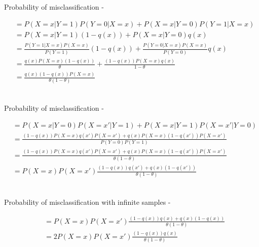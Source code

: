 \documentclass[letterpaper]{article}
\begin{document}
\subsection{}

Probability of misclassification - 

\begin{align*}
&=P(X=x|Y=1)P(Y=0|X=x)+P(X=x|Y=0)P(Y=1|X=x)\\
&=P(X=x|Y=1)(1-q(x))+P(X=x|Y=0)q(x)\\
&=\frac{P(Y=1|X=x)P(X=x)}{P(Y=1)}(1-q(x))+\frac{P(Y=0|X=x)P(X=x)}{P(Y=0)}q(x)\\
&=\frac{q(x)P(X=x)(1-q(x))}{\theta}+\frac{(1-q(x))P(X=x)q(x)}{1-\theta}\\
&=\frac{q(x)(1-q(x))P(X=x)}{\theta(1-\theta)}\\
\end{align*}

\subsection{}

Probability of misclassification - 

\begin{align*}
&=P(X=x|Y=0)P(X=x'|Y=1)+P(X=x|Y=1)P(X=x'|Y=0)\\
&=\frac{(1-q(x))P(X=x)q(x')P(X=x')+q(x)P(X=x)(1-q(x'))P(X=x')}{P(Y=0)P(Y=1)}\\
&=\frac{(1-q(x))P(X=x)q(x')P(X=x')+q(x)P(X=x)(1-q(x'))P(X=x')}{\theta(1-\theta)}\\
&=P(X=x)P(X=x')\frac{(1-q(x))q(x')+q(x)(1-q(x'))}{\theta(1-\theta)}\\
\end{align*}

\subsection{}

Probability of misclassification with infinite samples - 

\begin{align*}
&=P(X=x)P(X=x')\frac{(1-q(x))q(x)+q(x)(1-q(x))}{\theta(1-\theta)}\\
&=2P(X=x)P(X=x')\frac{(1-q(x))q(x)}{\theta(1-\theta)}\\
\end{align*}

\subsection{}
\end{document}
